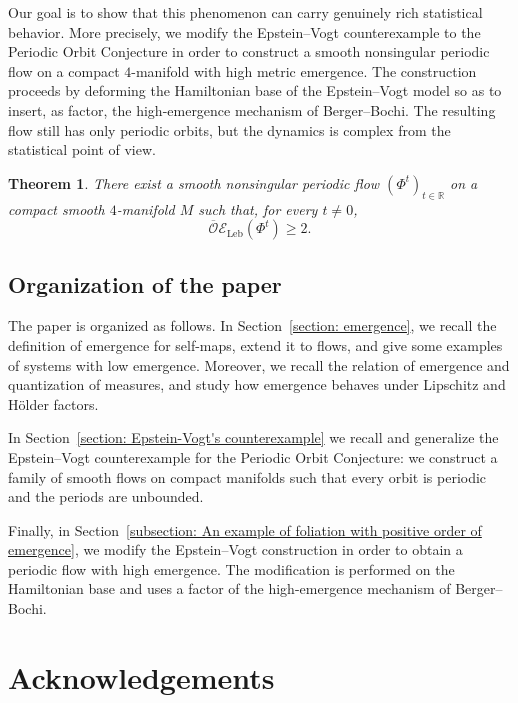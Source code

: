 \documentclass[11pt,reqno]{amsart}
\theoremstyle{plain}
\theoremstyle{definition}
\theoremstyle{remark}
\theoremstyle{plain}
\newtheorem{mainthm}{Theorem}
\numberwithin{equation}{section}
\begin{document}
Our goal is to show that this phenomenon can carry genuinely rich statistical behavior. More precisely, we modify the Epstein--Vogt counterexample to the Periodic Orbit Conjecture \cite{EV78} in order to construct a smooth nonsingular periodic flow on a compact $4$-manifold with high metric emergence. The construction proceeds by deforming the Hamiltonian base of the Epstein--Vogt model so as to insert, as factor, the high-emergence mechanism of Berger--Bochi. The resulting flow still has only periodic orbits, but the dynamics is complex from the statistical point of view.

\begin{mainthm}\label{thm:main-lower-bound}
There exist a smooth nonsingular periodic
flow $(\Phi^t)_{t\in\mathbb R}$ on a compact smooth $4$-manifold $M$ such that, for every $t\neq0$,
\begin{equation*}
\overline{\mathcal O}\mathcal E_\mathrm{Leb}(\Phi^t)\ge 2.
\end{equation*}
\end{mainthm}


\subsection{Organization of the paper}

The paper is organized as follows. In Section~\ref{section: emergence}, we recall the definition of emergence for self-maps, extend it to flows, and give some examples of systems with low emergence. Moreover, we recall the relation of emergence and quantization of measures, and study how emergence behaves under Lipschitz and H\"older factors. 

In Section~\ref{section: Epstein-Vogt's counterexample} we recall and generalize the Epstein--Vogt counterexample for the Periodic Orbit Conjecture: we construct a family of smooth flows on compact manifolds such that every orbit is periodic and the periods are unbounded. 

Finally, in Section~\ref{subsection: An example of foliation with positive order of emergence}, we modify the Epstein--Vogt construction in order to obtain a periodic flow with high emergence. The modification is performed on the Hamiltonian base and uses a factor of the high-emergence mechanism of Berger--Bochi.

\section*{Acknowledgements}
\end{document}
